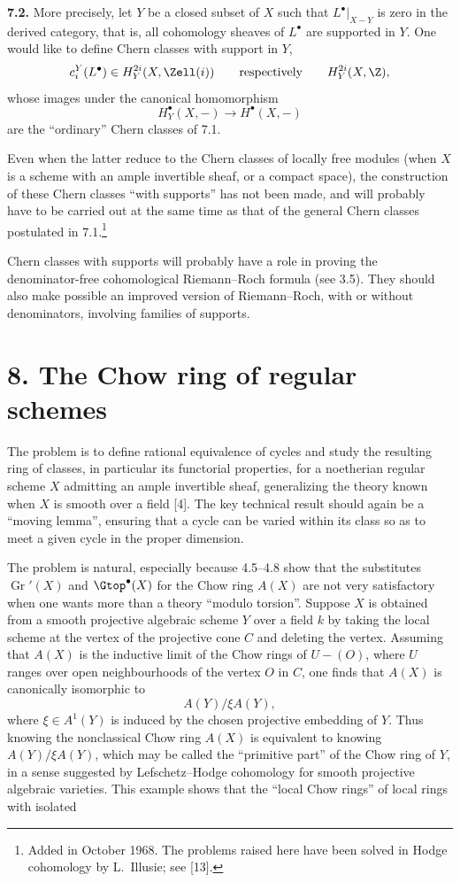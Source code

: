 \textbf{7.2.} More precisely, let $Y$ be a closed subset of $X$ such that
$L^\bullet|_{X-Y}$ is zero in the derived category, that is, all cohomology
sheaves of $L^\bullet$ are supported in $Y$. One would like to define Chern
classes with support in $Y$,
\[
 c_i^Y(L^\bullet)\in H_Y^{2i}(X,\Zell(i))
 \qquad\text{respectively}\qquad
 H_Y^{2i}(X,\Z),
\]
whose images under the canonical homomorphism
\[
 H_Y^\bullet(X,-)\longrightarrow H^\bullet(X,-)
\]
are the ``ordinary'' Chern classes of 7.1.

Even when the latter reduce to the Chern classes of locally free modules
(when $X$ is a scheme with an ample invertible sheaf, or a compact space),
the construction of these Chern classes ``with supports'' has not been
made, and will probably have to be carried out at the same time as that of
the general Chern classes postulated in 7.1.\footnote{Added in October
1968. The problems raised here have been solved in Hodge cohomology by
L.~Illusie; see [13].}

Chern classes with supports will probably have a role in proving the
denominator-free cohomological Riemann--Roch formula (see 3.5). They should
also make possible an improved version of Riemann--Roch, with or without
denominators, involving families of supports.

\section*{8. The Chow ring of regular schemes}

The problem is to define rational equivalence of cycles and study the
resulting ring of classes, in particular its functorial properties, for a
noetherian regular scheme $X$ admitting an ample invertible sheaf,
generalizing the theory known when $X$ is smooth over a field [4]. The key
technical result should again be a ``moving lemma'', ensuring that a cycle
can be varied within its class so as to meet a given cycle in the proper
dimension.

The problem is natural, especially because 4.5--4.8 show that the
substitutes $\operatorname{Gr}'(X)$ and $\Gtop^\bullet(X)$ for the Chow ring
$A(X)$ are not very satisfactory when one wants more than a theory
``modulo torsion''. Suppose $X$ is obtained from a smooth projective
algebraic scheme $Y$ over a field $k$ by taking the local scheme at the
vertex of the projective cone $C$ and deleting the vertex. Assuming that
$A(X)$ is the inductive limit of the Chow rings of $U-(O)$, where $U$
ranges over open neighbourhoods of the vertex $O$ in $C$, one finds that
$A(X)$ is canonically isomorphic to
\[
 A(Y)/\xi A(Y),
\]
where $\xi\in A^1(Y)$ is induced by the chosen projective embedding of $Y$.
Thus knowing the nonclassical Chow ring $A(X)$ is equivalent to knowing
$A(Y)/\xi A(Y)$, which may be called the ``primitive part'' of the Chow
ring of $Y$, in a sense suggested by Lefschetz--Hodge cohomology for smooth
projective algebraic varieties. This example shows that the ``local Chow
rings'' of local rings with isolated

